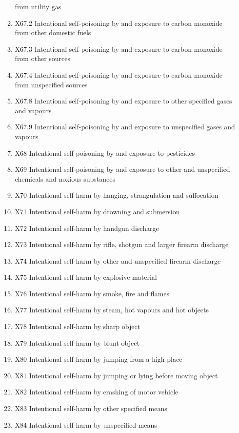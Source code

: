 \documentclass[
]{scrartcl}
\begin{document}
\begin{itemize}
\begin{enumerate}
    from utility gas
  \item
    X67.2 Intentional self-poisoning by and exposure to carbon monoxide
    from other domestic fuels
  \item
    X67.3 Intentional self-poisoning by and exposure to carbon monoxide
    from other sources
  \item
    X67.4 Intentional self-poisoning by and exposure to carbon monoxide
    from unspecified sources
  \item
    X67.8 Intentional self-poisoning by and exposure to other specified
    gases and vapours
  \item
    X67.9 Intentional self-poisoning by and exposure to unspecified
    gases and vapours
  \item
    X68 Intentional self-poisoning by and exposure to pesticides
  \item
    X69 Intentional self-poisoning by and exposure to other and
    unspecified chemicals and noxious substances
  \item
    X70 Intentional self-harm by hanging, strangulation and suffocation
  \item
    X71 Intentional self-harm by drowning and submersion
  \item
    X72 Intentional self-harm by handgun discharge
  \item
    X73 Intentional self-harm by rifle, shotgun and larger firearm
    discharge
  \item
    X74 Intentional self-harm by other and unspecified firearm discharge
  \item
    X75 Intentional self-harm by explosive material
  \item
    X76 Intentional self-harm by smoke, fire and flames
  \item
    X77 Intentional self-harm by steam, hot vapours and hot objects
  \item
    X78 Intentional self-harm by sharp object
  \item
    X79 Intentional self-harm by blunt object
  \item
    X80 Intentional self-harm by jumping from a high place
  \item
    X81 Intentional self-harm by jumping or lying before moving object
  \item
    X82 Intentional self-harm by crashing of motor vehicle
  \item
    X83 Intentional self-harm by other specified means
  \item
    X84 Intentional self-harm by unspecified means

\end{enumerate}
\end{itemize}
\end{document}
